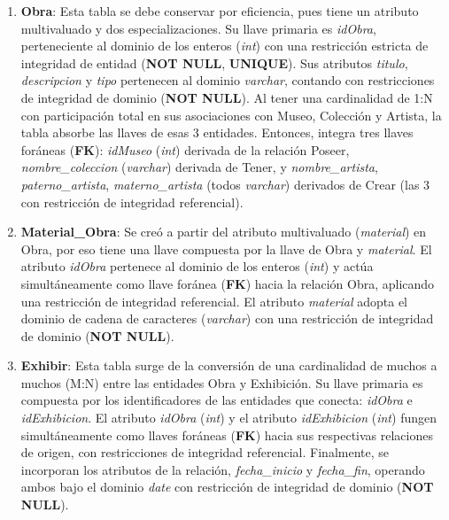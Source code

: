 \begin{enumerate}
	\item \textbf{Obra}: Esta tabla se debe conservar por eficiencia, pues tiene un atributo multivaluado y dos especializaciones. Su llave primaria es \textit{idObra}, perteneciente al dominio de los enteros (\textit{int}) con una restricción estricta de integridad de entidad (\textbf{NOT NULL}, \textbf{UNIQUE}). Sus atributos \textit{titulo}, \textit{descripcion} y \textit{tipo} pertenecen al dominio \textit{varchar}, contando con restricciones de integridad de dominio (\textbf{NOT NULL}). Al tener una cardinalidad de 1:N con participación total en sus asociaciones con Museo, Colección y Artista, la tabla absorbe las llaves de esas 3 entidades. Entonces, integra tres llaves foráneas (\textbf{FK}): \textit{idMuseo} (\textit{int}) derivada de la relación Poseer, \textit{nombre\_coleccion} (\textit{varchar}) derivada de Tener, y \textit{nombre\_artista}, \textit{paterno\_artista}, \textit{materno\_artista} (todos \textit{varchar}) derivados de Crear (las 3 con restricción de integridad referencial).

	\item \textbf{Material\_Obra}: Se creó a partir del atributo multivaluado (\textit{material}) en Obra, por eso tiene una llave compuesta por la llave de Obra y \textit{material}. El atributo \textit{idObra} pertenece al dominio de los enteros (\textit{int}) y actúa simultáneamente como llave foránea (\textbf{FK}) hacia la relación Obra, aplicando una restricción de integridad referencial. El atributo \textit{material} adopta el dominio de cadena de caracteres (\textit{varchar}) con una restricción de integridad de dominio (\textbf{NOT NULL}).

	\item \textbf{Exhibir}: Esta tabla surge de la conversión de una cardinalidad de muchos a muchos (M:N) entre las entidades Obra y Exhibición. Su llave primaria es compuesta por los identificadores de las entidades que conecta: \textit{idObra} e \textit{idExhibicion}. El atributo \textit{idObra} (\textit{int}) y el atributo \textit{idExhibicion} (\textit{int}) fungen simultáneamente como llaves foráneas (\textbf{FK}) hacia sus respectivas relaciones de origen, con restricciones de integridad referencial. Finalmente, se incorporan los atributos de la relación, \textit{fecha\_inicio} y \textit{fecha\_fin}, operando ambos bajo el dominio \textit{date} con restricción de integridad de dominio (\textbf{NOT NULL}).


\end{enumerate}
